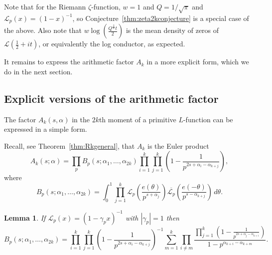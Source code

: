 \documentclass[12pt,letterpaper]{amsart}
\theoremstyle{plain}
\newtheorem{lemma}[theorem]{Lemma}
\theoremstyle{definition}
\theoremstyle{remark}
\numberwithin{equation}{subsection}
\numberwithin{theorem}{subsection}
\numberwithin{table}{subsection}
\def\({\left(}
\def\){\right)}
\begin{document}
Note that for the Riemann $\zeta$-function, $w=1$ and $Q=1/\sqrt{\pi}$
and $\mathcal{L}_p(x)=(1-x)^{-1}$,
so Conjecture~\ref{thm:zeta2kconjecture} is a special case of the above.
Also note that $w \log \(\frac{Q^{\frac{2}{w}} t}{2}\)$ is the mean
density of zeros of $\mathcal{L}(\frac12+it)$, or equivalently
the log conductor, as expected.

It remains to express the arithmetic factor $A_k$ in a more explicit
form, which we do in the next section.



\subsection{  Explicit versions of the arithmetic factor
}\label{sec:explicitarithmeticfactor}

The factor $A_k(s,\alpha)$ in the $2k$th moment of a primitive $L$-function
can be expressed in a simple form.

Recall, see Theorem~\ref{thm:Rkgeneral}, that $A_k$ is the Euler product
\begin{equation}
A_k(s; \alpha) =\prod_p 
B_p(s;\alpha_1,\dots,\alpha_{2k})
\prod_{i=1}^k\prod_{j=1}^k
\left(1-\frac{1}{p^{2s +\alpha_i-\alpha_{k+j}}}\right) ,
\end{equation}
where
\begin{equation} 
B_p(s;\alpha_1,\dots,\alpha_{2k}) =
\int_0^1 \prod_{j=1}^k
\mathcal{L}_p\left(\frac{e(\theta)}{p^{s+\alpha_j}}\right)
\overline{\mathcal{L}_p}\left(\frac{e(-\theta)}{p^{s-\alpha_{k+j}}}\right)
\,d\theta.
\end{equation}

\begin{lemma} \label{thm:Bplemma} If $\mathcal{L}_p(x) = (1-\gamma_p x)^{-1}$ with
$|\gamma_p|=1$ then
\begin{equation}
B_p(s;\alpha_1,\dots,\alpha_{2k}) = 
\prod_{i=1}^k\prod_{j=1}^k
\left(1-\frac{1}{p^{2s +\alpha_i-\alpha_{k+j}}}\right)^{-1}
\sum_{m=1}^k
    \prod_{i\neq m}
       \frac{\displaystyle \prod_{j=1}^k \(1-\frac{1}{p^{2s+\alpha_j-\alpha_{k+i}}}\)}
                         {1-p^{\alpha_{k+i}-\alpha_{k+m}}}.
\end{equation}
\end{lemma}
\end{document}
